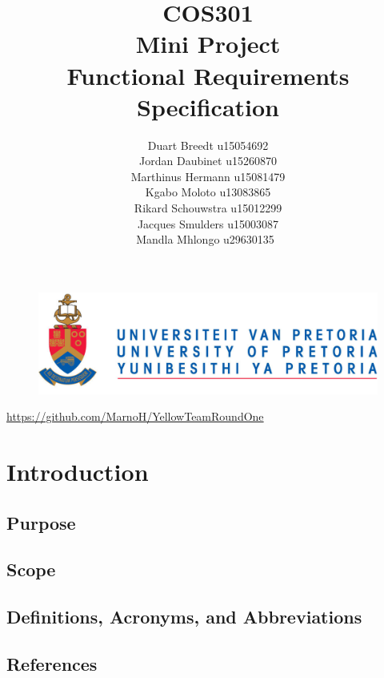 \documentclass[12pt]{article}
\begin{document}
	

	\begin{figure}
		\includegraphics[width=\linewidth]{logo.jpg}	
	\end{figure}

	\title 	{
				COS301\\
				Mini Project\\
				Functional Requirements Specification
		   	}
	\author {
				Duart Breedt u15054692\\
				Jordan Daubinet u15260870\\
				Marthinus Hermann u15081479\\
				Kgabo Moloto u13083865\\
				Rikard Schouwstra u15012299\\
				Jacques Smulders u15003087\\
				Mandla Mhlongo u29630135\
			}
	\maketitle
	\begin{center}
			\url{https://github.com/MarnoH/YellowTeamRoundOne}	
	\end{center}
	\newpage
	\tableofcontents
	\newpage
	\section{Introduction}

	\subsection{Purpose}
		
	\subsection{Scope}
	\subsection{Definitions, Acronyms, and Abbreviations}
	\subsection{References}
\end{document}
